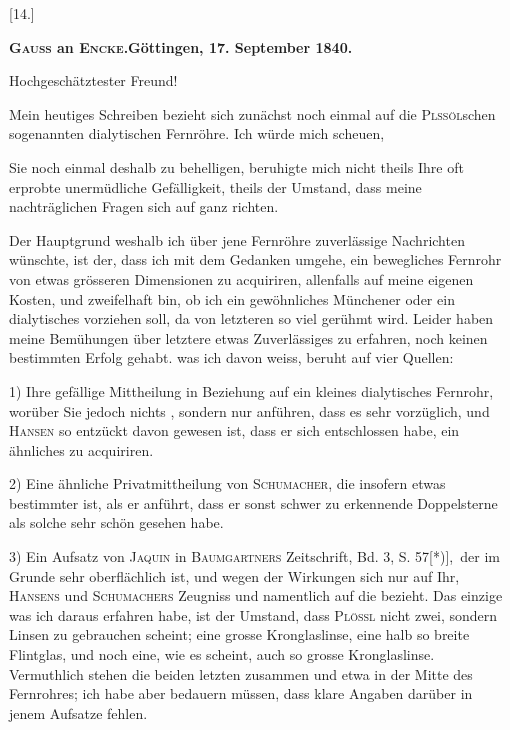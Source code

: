 \clearpage\begingroup
{}
\begin{center}
[14.]\par\medskip
\textbf{\textsc{Gauss} an \textsc{Encke}.\quad Göttingen, 17. September 1840.}\par\medskip
Hochgeschätztester Freund!
\end{center}
\noindent\hspace*{\parindent}Mein heutiges Schreiben bezieht sich zunächst noch einmal auf die \textsc{Plssöl}schen sogenannten dialytischen Fernröhre. Ich würde mich scheuen,
\par\clearpage{}
\noindent Sie noch einmal deshalb zu behelligen, beruhigte mich nicht theils Ihre oft erprobte unermüdliche Gefälligkeit, theils der Umstand, dass meine nachträglichen Fragen sich auf ganz  richten.

Der Hauptgrund weshalb ich über jene Fernröhre zuverlässige Nachrichten wünschte, ist der, dass ich mit dem Gedanken umgehe, ein bewegliches Fernrohr von etwas grösseren Dimensionen zu acquiriren, allenfalls auf meine eigenen Kosten, und zweifelhaft bin, ob ich ein gewöhnliches Münchener oder ein dialytisches vorziehen soll, da von letzteren so viel gerühmt wird. Leider haben meine Bemühungen über letztere etwas Zuverlässiges zu erfahren, noch keinen bestimmten Erfolg gehabt.  was ich davon weiss, beruht auf vier Quellen:

1) Ihre gefällige Mittheilung in Beziehung auf ein kleines dialytisches Fernrohr, worüber Sie jedoch nichts , sondern nur  anführen, dass es sehr vorzüglich, und \textsc{Hansen} so entzückt davon gewesen ist, dass er sich entschlossen habe, ein ähnliches zu acquiriren.

2) Eine ähnliche Privatmittheilung von \textsc{Schumacher}, die insofern etwas bestimmter ist, als er anführt, dass er sonst schwer zu erkennende Doppelsterne als solche sehr schön gesehen habe.

3) Ein Aufsatz von \textsc{Jaquin} in \textsc{Baumgartners} Zeitschrift, Bd. 3, S. 57[*)],\begingroup\renewcommand{\thefootnote}{}\endgroup\ der im Grunde sehr oberflächlich ist, und wegen der Wirkungen sich nur auf Ihr, \textsc{Hansens} und \textsc{Schumachers} Zeugniss und namentlich auf die  bezieht. Das einzige was ich daraus erfahren habe, ist der Umstand, dass \textsc{Plössl} nicht zwei, sondern  Linsen zu gebrauchen scheint; eine grosse Kronglaslinse, eine halb so breite Flintglas, und noch eine, wie es scheint, auch so grosse Kronglaslinse. Vermuthlich stehen die beiden letzten  zusammen und etwa in der Mitte des Fernrohres; ich habe aber bedauern müssen, dass klare Angaben darüber in jenem Aufsatze fehlen.

